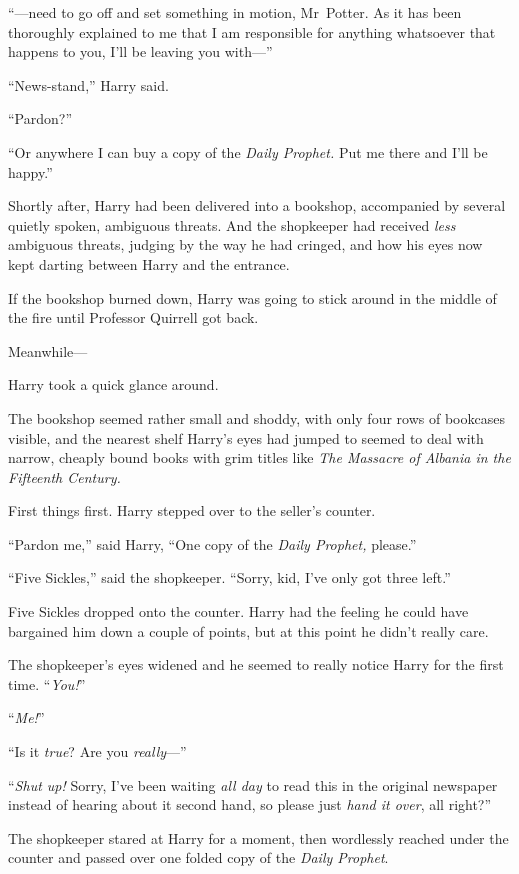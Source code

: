 “—need to go off and set something in motion, Mr~Potter. As it has been thoroughly explained to me that I am responsible for anything whatsoever that happens to you, I’ll be leaving you with—”

“News-stand,” Harry said.

“Pardon?”

“Or anywhere I can buy a copy of the \emph{Daily Prophet.} Put me there and I’ll be happy.”

Shortly after, Harry had been delivered into a bookshop, accompanied by several quietly spoken, ambiguous threats. And the shopkeeper had received \emph{less} ambiguous threats, judging by the way he had cringed, and how his eyes now kept darting between Harry and the entrance.

If the bookshop burned down, Harry was going to stick around in the middle of the fire until Professor Quirrell got back.

Meanwhile—

Harry took a quick glance around.

The bookshop seemed rather small and shoddy, with only four rows of bookcases visible, and the nearest shelf Harry’s eyes had jumped to seemed to deal with narrow, cheaply bound books with grim titles like \emph{The Massacre of Albania in the Fifteenth Century.}

First things first. Harry stepped over to the seller’s counter.

“Pardon me,” said Harry, “One copy of the \emph{Daily Prophet,} please.”

“Five Sickles,” said the shopkeeper. “Sorry, kid, I’ve only got three left.”

Five Sickles dropped onto the counter. Harry had the feeling he could have bargained him down a couple of points, but at this point he didn’t really care.

The shopkeeper’s eyes widened and he seemed to really notice Harry for the first time. “\emph{You!}”

“\emph{Me!}”

“Is it \emph{true}? Are you \emph{really}—”

“\emph{Shut up!} Sorry, I’ve been waiting \emph{all day} to read this in the original newspaper instead of hearing about it second hand, so please just \emph{hand it over}, all right?”

The shopkeeper stared at Harry for a moment, then wordlessly reached under the counter and passed over one folded copy of the \emph{Daily Prophet}.

